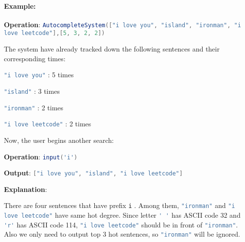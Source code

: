 \paragraph{Example:}

\begin{flushleft}

\textbf{Operation}:
 \lstinline[language=Java, basicstyle=\small\ttfamily, keywordstyle=\bfseries\color{green!40!black}]|AutocompleteSystem(["i love you", "island", "ironman", "i love leetcode"],[5, 3, 2, 2])|

The system have already tracked down the following sentences and their corresponding times:

\lstinline[language=Java, basicstyle=\small\ttfamily, keywordstyle=\bfseries\color{green!40!black}]|"i love you"| : 5 times

\lstinline[language=Java, basicstyle=\small\ttfamily, keywordstyle=\bfseries\color{green!40!black}]|"island"| : 3 times

\lstinline[language=Java, basicstyle=\small\ttfamily, keywordstyle=\bfseries\color{green!40!black}]|"ironman"| : 2 times

\lstinline[language=Java, basicstyle=\small\ttfamily, keywordstyle=\bfseries\color{green!40!black}]|"i love leetcode"| : 2 times

Now, the user begins another search:

\textbf{Operation}: \lstinline[language=Java, basicstyle=\small\ttfamily, keywordstyle=\bfseries\color{green!40!black}]|input('i')|

\textbf{Output}: \lstinline[language=Java, basicstyle=\small\ttfamily, keywordstyle=\bfseries\color{green!40!black}]|["i love you", "island", "i love leetcode"]|

\textbf{Explanation}:

There are four sentences that have prefix \texttt{i} . Among them, \lstinline[language=Java, basicstyle=\small\ttfamily, keywordstyle=\bfseries\color{green!40!black}]|"ironman"| and \lstinline[language=Java, basicstyle=\small\ttfamily, keywordstyle=\bfseries\color{green!40!black}]|"i love leetcode"| have same hot degree. Since letter \lstinline[language=Java, basicstyle=\small\ttfamily, keywordstyle=\bfseries\color{green!40!black}]|' '| has ASCII code 32 and \lstinline[language=Java, basicstyle=\small\ttfamily, keywordstyle=\bfseries\color{green!40!black}]|'r'| has ASCII code 114, \lstinline[language=Java, basicstyle=\small\ttfamily, keywordstyle=\bfseries\color{green!40!black}]|"i love leetcode"| should be in front of \lstinline[language=Java, basicstyle=\small\ttfamily, keywordstyle=\bfseries\color{green!40!black}]|"ironman"|. Also we only need to output top 3 hot sentences, so \lstinline[language=Java, basicstyle=\small\ttfamily, keywordstyle=\bfseries\color{green!40!black}]|"ironman"| will be ignored.


\end{flushleft}
